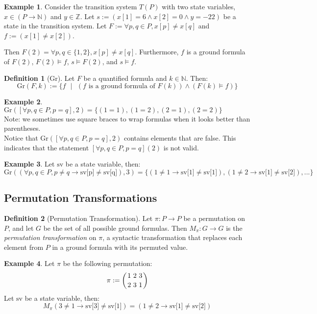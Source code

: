 \documentclass[12pt]{article}
\theoremstyle{definition}
\newtheorem{definition}{Definition}
\newtheorem{example}{Example}
\theoremstyle{remark}
\newcommand{\msp}{\text{ }}
\newcommand{\st}{\text{ }|\text{ }}
\newcommand{\gr}{\text{Gr}}
\newcommand{\perm}{\genfrac{}{}{0pt}{}}
\begin{document}
\begin{example}
  Consider the transition system $T(P)$ with two state variables, $x \in (P \to \mathbb{N})$ and $y \in \mathbb{Z}$.  Let $s := (x[1]=6 \land x[2]=0 \land y=-22)$ be a state in the transition system.  Let $F := \forall p,q \in P, x[p] \neq x[q]$ and $f := (x[1] \neq x[2])$.

  Then $F(2) = \forall p,q \in \{1,2\}, x[p] \neq x[q]$.  Furthermore, $f$ is a ground formula of $F(2)$, $F(2) \models f$, $s \models F(2)$, and $s \models f$.
\end{example}

\begin{definition}[Gr]
  Let $F$ be a quantified formula and $k \in \mathbb{N}$.  Then:
  $$\gr(F,k) := \{f \st (f \text{ is a ground formula of } F(k)) \land (F(k) \models f)\}$$
\end{definition}

\begin{example}
  $\gr([\forall p,q \in P, p=q],2) = \{(1=1),(1=2),(2=1),(2=2)\}$\\
  Note: we sometimes use square braces to wrap formulas when it looks better than parentheses.\\
  Notice that $\gr([\forall p,q \in P, p=q],2)$ contains elements that are false.  This indicates that the statement $[\forall p,q \in P, p=q](2)$ is not valid.
\end{example}
\begin{example}
  Let $\text{sv}$ be a state variable, then:
  $$\gr((\forall p,q \in P, p \neq q \rightarrow \text{sv[p]} \neq \text{sv[q]}),3) = \{(1 \neq 1 \rightarrow \text{sv[1]} \neq \text{sv[1]}),(1 \neq 2 \rightarrow \text{sv[1]} \neq \text{sv[2]}),...\}$$
\end{example}

\subsection{Permutation Transformations}

\begin{definition}[Permutation Transformation]
  Let $\pi : P \to P$ be a permutation on $P$, and let $G$ be the set of all possible ground formulas.  Then $M_\pi : G \to G$ is the \textit{permutation transformation} on $\pi$, a syntactic transformation that replaces each element from $P$ in a ground formula with its permuted value.
\end{definition}

\begin{example}
  Let $\pi$ be the following permutation:
  $$\pi := \left( \perm{1 \msp 2 \msp 3}{2 \msp 3 \msp 1} \right)$$
  Let $\text{sv}$ be a state variable, then:
  $$M_\pi(3 \neq 1 \rightarrow \text{sv[3]} \neq \text{sv[1]}) = (1 \neq 2 \rightarrow \text{sv[1]} \neq \text{sv[2]})$$
\end{example}
\end{document}
